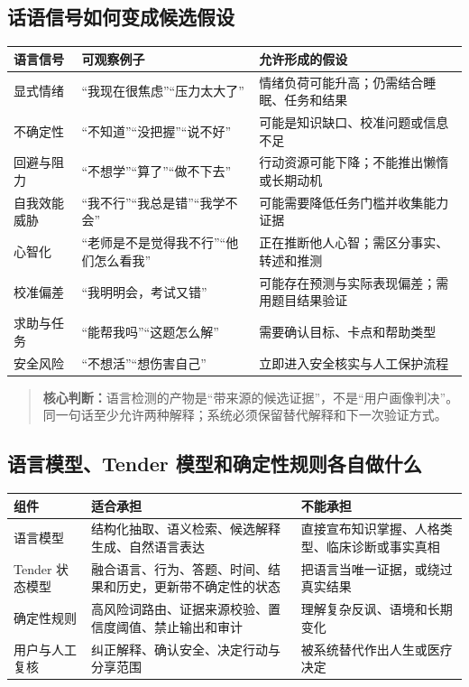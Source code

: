 \documentclass[UTF8,a4paper,11pt]{ctexart}
\newcommand{\keypoint}[1]{\begin{quote}\noindent\textbf{\color{TenderBlue}核心判断：}#1\end{quote}}
\begin{document}
\subsection{话语信号如何变成候选假设}

\begin{center}
\begin{longtable}{@{}p{2.8cm}p{4.4cm}p{5.9cm}@{}}
\toprule
\textbf{语言信号} & \textbf{可观察例子} & \textbf{允许形成的假设} \\
\midrule
显式情绪 & “我现在很焦虑”“压力太大了” & 情绪负荷可能升高；仍需结合睡眠、任务和结果 \\
不确定性 & “不知道”“没把握”“说不好” & 可能是知识缺口、校准问题或信息不足 \\
回避与阻力 & “不想学”“算了”“做不下去” & 行动资源可能下降；不能推出懒惰或长期动机 \\
自我效能威胁 & “我不行”“我总是错”“我学不会” & 可能需要降低任务门槛并收集能力证据 \\
心智化 & “老师是不是觉得我不行”“他们怎么看我” & 正在推断他人心智；需区分事实、转述和推测 \\
校准偏差 & “我明明会，考试又错” & 可能存在预测与实际表现偏差；需用题目结果验证 \\
求助与任务 & “能帮我吗”“这题怎么解” & 需要确认目标、卡点和帮助类型 \\
安全风险 & “不想活”“想伤害自己” & 立即进入安全核实与人工保护流程 \\
\bottomrule
\end{longtable}
\end{center}

\keypoint{语言检测的产物是“带来源的候选证据”，不是“用户画像判决”。同一句话至少允许两种解释；系统必须保留替代解释和下一次验证方式。}

\subsection{语言模型、Tender 模型和确定性规则各自做什么}

\begin{center}
\begin{longtable}{@{}p{3.1cm}p{5.5cm}p{4.5cm}@{}}
\toprule
\textbf{组件} & \textbf{适合承担} & \textbf{不能承担} \\
\midrule
语言模型 & 结构化抽取、语义检索、候选解释生成、自然语言表达 & 直接宣布知识掌握、人格类型、临床诊断或事实真相 \\
Tender 状态模型 & 融合语言、行为、答题、时间、结果和历史，更新带不确定性的状态 & 把语言当唯一证据，或绕过真实结果 \\
确定性规则 & 高风险词路由、证据来源校验、置信度阈值、禁止输出和审计 & 理解复杂反讽、语境和长期变化 \\
用户与人工复核 & 纠正解释、确认安全、决定行动与分享范围 & 被系统替代作出人生或医疗决定 \\
\bottomrule
\end{longtable}
\end{center}
\end{document}
